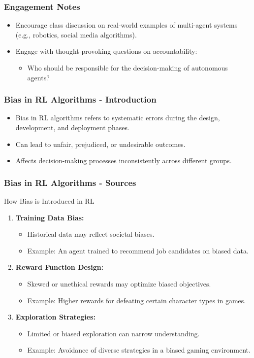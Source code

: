 \documentclass[aspectratio=169]{beamer}
\begin{document}
\begin{frame}[fragile]
  \frametitle{Engagement Notes}
  \begin{itemize}
    \item Encourage class discussion on real-world examples of multi-agent systems (e.g., robotics, social media algorithms).
    \item Engage with thought-provoking questions on accountability:
    \begin{itemize}
      \item Who should be responsible for the decision-making of autonomous agents?
    \end{itemize}
  \end{itemize}
\end{frame}

\begin{frame}[fragile]
  \frametitle{Bias in RL Algorithms - Introduction}
  \begin{itemize}
    \item Bias in RL algorithms refers to systematic errors during the design, development, and deployment phases.
    \item Can lead to unfair, prejudiced, or undesirable outcomes.
    \item Affects decision-making processes inconsistently across different groups.
  \end{itemize}
\end{frame}

\begin{frame}[fragile]
  \frametitle{Bias in RL Algorithms - Sources}
  \begin{block}{How Bias is Introduced in RL}
    \begin{enumerate}
      \item \textbf{Training Data Bias:}
        \begin{itemize}
          \item Historical data may reflect societal biases.
          \item Example: An agent trained to recommend job candidates on biased data.
        \end{itemize}
      \item \textbf{Reward Function Design:}
        \begin{itemize}
          \item Skewed or unethical rewards may optimize biased objectives.
          \item Example: Higher rewards for defeating certain character types in games.
        \end{itemize}
      \item \textbf{Exploration Strategies:}
        \begin{itemize}
          \item Limited or biased exploration can narrow understanding.
          \item Example: Avoidance of diverse strategies in a biased gaming environment.
        \end{itemize}
    \end{enumerate}
  \end{block}
\end{frame}
\end{document}
